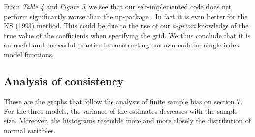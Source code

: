  



From \textit{Table 4} and \textit{Figure 3}, we see that our self-implemented code does not perform significantly worse than the np-package \cite{[28]}. In fact it is even better for the KS (1993) \cite{[12]} method. This could be due to the use of our \textit{a-priori} knowledge of the true value of the coefficients when specifying the grid. We thus conclude that it is an useful and successful practice in constructing our own code for single index model functions.

\subsection{Analysis of consistency}
These are the graphs that follow the analysis of finite sample bias on section 7. For the three models, the variance of the estimates decreases with the sample size. Moreover, the histograms resemble more and more closely the distribution of normal variables.

